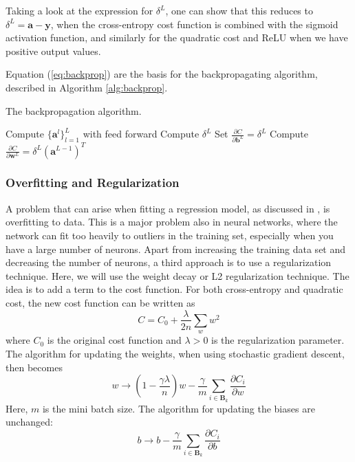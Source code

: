 Taking a look at the expression for $\delta^L$, one can show that this reduces to $\delta^L = \boldsymbol{a}-\boldsymbol{y}$, when the cross-entropy cost function is combined with the sigmoid activation function, and similarly for the quadratic cost and ReLU when we have positive output values.

Equation (\ref{eq:backprop}) are the basis for the backpropagating algorithm, described in Algorithm \ref{alg:backprop}.
\begin{algorithm}[htbp]\caption{The backpropagation algorithm.}\label{alg:backprop}
	\SetAlgoLined
	\BlankLine
	\BlankLine
	Compute $\{ \boldsymbol{a}^l\}_{l=1}^L$ with feed forward\;
	Compute $\delta^L$\;
	Set $\frac{\partial C}{\partial \boldsymbol{b}^L} = \delta^L$\;
	Compute $\frac{\partial C}{\partial \boldsymbol{w}^L} = \delta^L(\boldsymbol{a}^{L-1})^T$\;
	\BlankLine
	\BlankLine
	\end{algorithm}

\subsubsection*{Overfitting and Regularization}
A problem that can arise when fitting a regression model, as discussed in \cite{prosjekt1}, is overfitting to data. This is a major problem also in neural networks, where the network can fit too heavily to outliers in the training set, especially when you have a large number of neurons. Apart from increasing the training data set and decreasing the number of neurons, a third approach is to use a regularization technique. Here, we will use the weight decay or L2 regularization technique.
The idea is to add a term to the cost function. For both cross-entropy and quadratic cost, the new cost function can be written as
\begin{equation*}
  C = C_0 + \frac{\lambda}{2n}\sum_w w^2
\end{equation*}
where $C_0$ is the original cost function and $\lambda>0$ is the regularization parameter.
The algorithm for updating the weights, when using stochastic gradient descent, then becomes
\begin{equation}\label{eq:w_update}
  w \rightarrow \left(1-\frac{\gamma\lambda}{n}\right)w -  \frac{\gamma}{m}\sum_{i \in \boldsymbol{B}_k}\frac{\partial C_i}{\partial w}
\end{equation}
Here, $m$ is the mini batch size. The algorithm for updating the biases are unchanged:
\begin{equation}\label{eq:b_update}
  b \rightarrow b -  \frac{\gamma}{m}\sum_{i \in \boldsymbol{B}_k}\frac{\partial C_i}{\partial b}
\end{equation}

